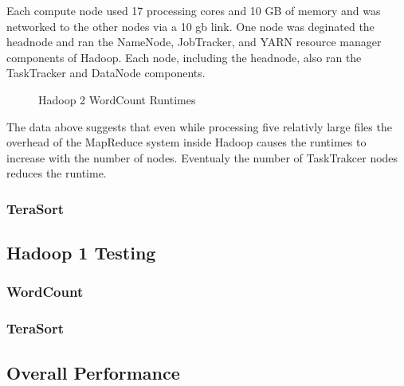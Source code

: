 \documentclass[conference]{IEEEtran}
\begin{document}
		Each compute node used 17 processing cores and 10 GB of memory and was networked to the other nodes via a 10 gb link. One node was deginated the headnode and ran the NameNode, JobTracker, and YARN resource manager components of Hadoop. Each node, including the headnode, also ran the TaskTracker and DataNode components.
                  \begin{figure}[h]
                    \begin{center}
                        
                        \caption{Hadoop 2 WordCount Runtimes}
                    \end{center}
                  \end{figure}
		
		The data above suggests that even while processing five relativly large files the overhead of the MapReduce system inside Hadoop causes the runtimes to increase with the number of nodes. Eventualy the number of TaskTrakcer nodes reduces the runtime.

			\subsubsection{TeraSort}
		\subsection{Hadoop 1 Testing}
			\subsubsection{WordCount}
			\subsubsection{TeraSort}
		\subsection{Overall Performance}
\end{document}
